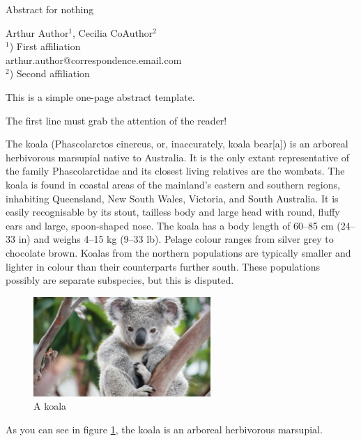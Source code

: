 \documentclass[a4paper]{article}
\begin{document}
\Large
 \begin{center}
Abstract for nothing\\ 

\hspace{10pt}

\large
Arthur Author$^1$, Cecilia CoAuthor$^2$ \\
\hspace{10pt}
\small  
$^1$) First affiliation\\
arthur.author@correspondence.email.com\\
$^2$) Second affiliation
\end{center} %

\hspace{10pt}
\normalsize
This is a simple one-page abstract template.

The first line must grab the attention of the reader!

The koala (Phascolarctos cinereus, or, inaccurately, koala bear[a]) is an arboreal herbivorous marsupial native to Australia. It is the only extant representative of the family Phascolarctidae and its closest living relatives are the wombats. The koala is found in coastal areas of the mainland's eastern and southern regions, inhabiting Queensland, New South Wales, Victoria, and South Australia. It is easily recognisable by its stout, tailless body and large head with round, fluffy ears and large, spoon-shaped nose. The koala has a body length of 60–85 cm (24–33 in) and weighs 4–15 kg (9–33 lb). Pelage colour ranges from silver grey to chocolate brown. Koalas from the northern populations are typically smaller and lighter in colour than their counterparts further south. These populations possibly are separate subspecies, but this is disputed.


\begin{figure}[h]
    \centering
    \includegraphics[width=0.6\textwidth]{figs/koala.jpg}
    \caption{A koala}
    \label{fig:koala}
\end{figure}
 
As you can see in figure \ref{fig:koala}, the koala is an arboreal herbivorous marsupial.
\end{document}

